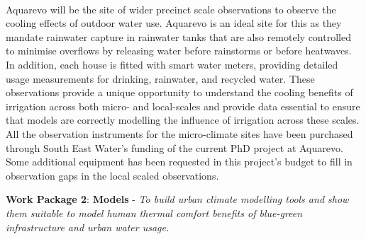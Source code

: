 \\[6pt]
Aquarevo will be the site of wider precinct scale observations to observe the cooling effects of outdoor water use. Aquarevo is an ideal site for this as they mandate rainwater capture in rainwater tanks that are also remotely controlled to minimise overflows by releasing water before rainstorms or before heatwaves. In addition, each house is fitted with smart water meters, providing detailed usage measurements for drinking, rainwater, and recycled water. These observations provide a unique opportunity to understand the cooling benefits of irrigation across both micro- and local-scales and provide data essential to ensure that models are correctly modelling the influence of irrigation across these scales. All the observation instruments for the micro-climate sites have been purchased through South East Water's funding of the current PhD project at Aquarevo. Some additional equipment has been requested in this project's budget to fill in observation gaps in the local scaled observations.

\textbf{Work Package 2}: \textbf{Models} - \emph{To build urban climate modelling tools and show them suitable to model human thermal comfort benefits of blue-green infrastructure and urban water usage.  }

